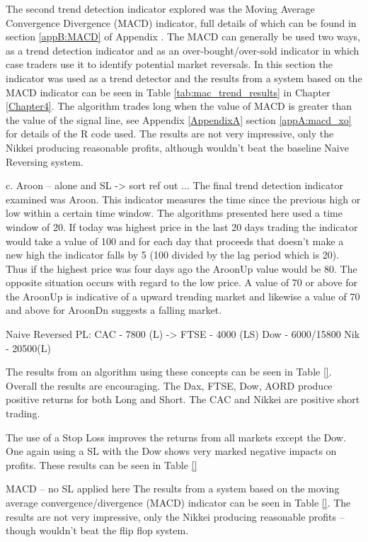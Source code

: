 The second trend detection indicator explored was the Moving Average Convergence Divergence (MACD) indicator, full details of which can be found in section \ref{appB:MACD} of Appendix \label{AppendixB}. The MACD can generally be used two ways, as a trend detection indicator and as an over-bought/over-sold indicator in which case traders use it to identify potential market reversals. In this section the indicator was used as a trend detector and the results from a system based on the MACD indicator can be seen in Table \ref{tab:mac_trend_results} in Chapter \ref{Chapter4}.  The algorithm trades long when the value of MACD is greater than the value of the signal line, see Appendix \ref{AppendixA} section \ref{appA:macd_xo} for details of the R code used. The results are not very impressive, only the Nikkei producing reasonable profits, although wouldn't beat the baseline Naive Reversing system.

c. Aroon – alone and SL -> sort ref out ...
The final trend detection indicator examined was Aroon.  This indicator measures the time since the previous high or low within a certain time window. The algorithms presented here used a time window of 20. If today was highest price in the last 20 days trading the indicator would take a value of 100 and for each day that proceeds that doesn't make a new high the indicator falls by 5 (100 divided by the lag period which is 20).  Thus if the highest price was four days ago the AroonUp value would be 80. The opposite situation occurs with regard to the low price. A value of 70 or above for the AroonUp is indicative of a upward trending market and likewise a value of 70 and above for AroonDn suggests a falling market.

Naive Reversed PL:
CAC - 7800 (L)  -> 
FTSE - 4000 (LS)
Dow - 6000/15800
Nik - 20500(L)

The results from an algorithm using these concepts can be seen in Table \ref{}. Overall the results are encouraging.  The Dax, FTSE, Dow, AORD produce positive returns for both Long and Short. The CAC and Nikkei are positive short trading. 

The use of a Stop Loss improves the returns from all markets except the Dow. One again using a SL with the Dow shows very marked negative impacts on profits. These results can be seen in Table \ref{}

MACD – no SL applied here
The results from a system based on the moving average convergence/divergence (MACD) indicator can be seen in Table \ref{}. The results are not very impressive, only the Nikkei producing reasonable profits – though wouldn't beat the flip flop system.

